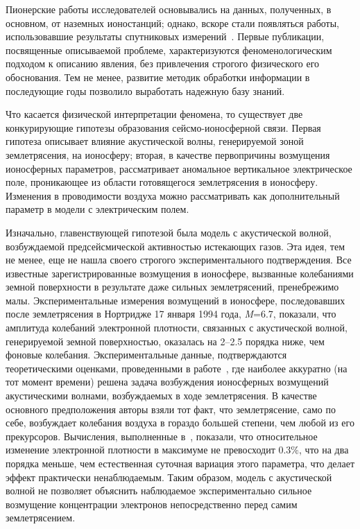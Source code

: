 \documentclass[12pt, oneside, a4paper]{article}
\begin{document}
Пионерские работы исследователей основывались на данных, полученных, в основном, от наземных ионостанций; однако, вскоре стали появляться работы, использовавшие результаты спутниковых измерений~\cite{Gokhberg:1983}. Первые публикации, посвященные описываемой проблеме, характеризуются феноменологическим подходом к описанию явления, без привлечения строгого физического его обоснования. Тем не менее, развитие методик обработки информации в последующие годы позволило выработать надежную базу знаний.

Что касается физической интерпретации феномена, то существует две конкурирующие гипотезы образования сейсмо-ионосферной связи. Первая гипотеза описывает влияние акустической волны, генерируемой зоной землетрясения, на ионосферу; вторая, в качестве первопричины возмущения ионосферных параметров, рассматривает аномальное вертикальное электрическое поле, проникающее из области готовящегося землетрясения в ионосферу.  Изменения в проводимости воздуха можно рассматривать как дополнительный параметр в модели с электрическим полем. 

Изначально, главенствующей гипотезой была модель с акустической волной, возбуждаемой предсейсмической активностью истекающих газов. Эта идея, тем не менее, еще не нашла своего строгого экспериментального подтверждения. Все известные зарегистрированные возмущения в ионосфере, вызванные колебаниями земной поверхности в результате даже сильных землетрясений, пренебрежимо малы.  Экспериментальные измерения возмущений в ионосфере, последовавших после землетрясения в Нортридже 17 января 1994 года, \emph{M}=6.7, показали, что амплитуда колебаний электронной плотности, связанных с акустической волной, генерируемой земной поверхностью, оказалась на 2--2.5 порядка ниже, чем фоновые колебания. Экспериментальные данные, подтверждаются теоретическими оценками, проведенными в работе~\cite{Davies_Archambeau:1998}, где наиболее аккуратно (на тот момент времени) решена задача возбуждения ионосферных возмущений акустическими волнами, возбуждаемых в ходе землетрясения. В качестве основного предположения авторы взяли тот факт, что землетрясение, само по себе, возбуждает колебания воздуха в гораздо большей степени, чем любой из его прекурсоров. Вычисления, выполненные в~\cite{Davies_Archambeau:1998}, показали, что относительное изменение электронной плотности в максимуме не превосходит $0.3\%$, что на два порядка меньше, чем естественная суточная вариация этого параметра, что делает эффект практически ненаблюдаемым. Таким образом, модель с акустической волной не позволяет объяснить наблюдаемое экспериментально сильное возмущение концентрации электронов непосредственно перед самим землетрясением. 
\end{document}
